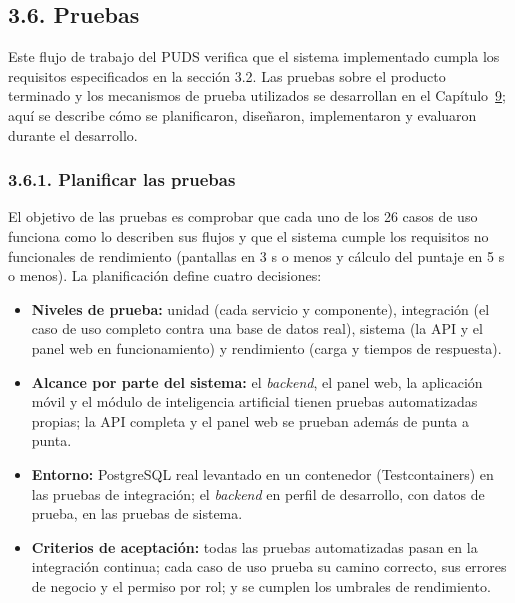 \subsection{3.6. Pruebas}\label{sec:v2_flujo_pruebas}

Este flujo de trabajo del PUDS verifica que el sistema implementado cumpla los requisitos especificados en la sección 3.2. Las pruebas sobre el producto terminado y los mecanismos de prueba utilizados se desarrollan en el Capítulo~\hyperref[cap:pruebas]{9}; aquí se describe cómo se planificaron, diseñaron, implementaron y evaluaron durante el desarrollo.

\subsubsection{3.6.1. Planificar las pruebas}

El objetivo de las pruebas es comprobar que cada uno de los 26 casos de uso funciona como lo describen sus flujos y que el sistema cumple los requisitos no funcionales de rendimiento (pantallas en 3 s o menos y cálculo del puntaje en 5 s o menos). La planificación define cuatro decisiones:

\begin{itemize}
    \item \textbf{Niveles de prueba:} unidad (cada servicio y componente), integración (el caso de uso completo contra una base de datos real), sistema (la API y el panel web en funcionamiento) y rendimiento (carga y tiempos de respuesta).
    \item \textbf{Alcance por parte del sistema:} el \textit{backend}, el panel web, la aplicación móvil y el módulo de inteligencia artificial tienen pruebas automatizadas propias; la API completa y el panel web se prueban además de punta a punta.
    \item \textbf{Entorno:} PostgreSQL real levantado en un contenedor (Testcontainers) en las pruebas de integración; el \textit{backend} en perfil de desarrollo, con datos de prueba, en las pruebas de sistema.
    \item \textbf{Criterios de aceptación:} todas las pruebas automatizadas pasan en la integración continua; cada caso de uso prueba su camino correcto, sus errores de negocio y el permiso por rol; y se cumplen los umbrales de rendimiento.
\end{itemize}


